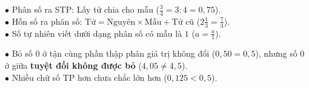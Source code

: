 \documentclass[14pt,a4paper,oneside]{extbook}
\begin{document}
\noindent
\begin{minipage}[t]{0.54\textwidth}
  \begin{tcolorbox}[
    enhanced,
    title={\footnotesize\bfseries\color{white}\faExchange\ Quy tắc chuyển đổi ba dạng số},
    colback=green!3!white,
    colframe=green!60!black,
    arc=2.5mm, boxrule=0.8pt, top=1.8mm, bottom=1.8mm, left=2.2mm, right=2.2mm
  ]
    \footnotesize
    $\bullet$ Phân số ra STP: Lấy tử chia cho mẫu ($\frac{3}{4} = 3 : 4 = 0,75$).\\
    $\bullet$ Hỗn số ra phân số: $\text{Tử} = \text{Nguyên} \times \text{Mẫu} + \text{Tử cũ}$ ($2\frac{1}{3} = \frac{7}{3}$).\\
    $\bullet$ Số tự nhiên viết dưới dạng phân số có mẫu là $1$ ($a = \frac{a}{1}$).
  \end{tcolorbox}
\end{minipage}%
\hfill
\begin{minipage}[t]{0.44\textwidth}
  \begin{tcolorbox}[
    enhanced,
    title={\footnotesize\bfseries\color{white}\faExclamationTriangle\ Mẹo tránh bẫy trắc nghiệm},
    colback=red!2!white,
    colframe=red!70!black,
    arc=2.5mm, boxrule=0.8pt, top=1.8mm, bottom=1.8mm, left=2.2mm, right=2.2mm
  ]
    \footnotesize
    $\bullet$ Bỏ số $0$ ở tận cùng phần thập phân giá trị không đổi ($0,50 = 0,5$), nhưng số $0$ ở giữa \textbf{tuyệt đối không được bỏ} ($4,05 \neq 4,5$).\\
    $\bullet$ Nhiều chữ số TP hơn chưa chắc lớn hơn ($0,125 < 0,5$).
  \end{tcolorbox}
\end{minipage}
\end{document}
